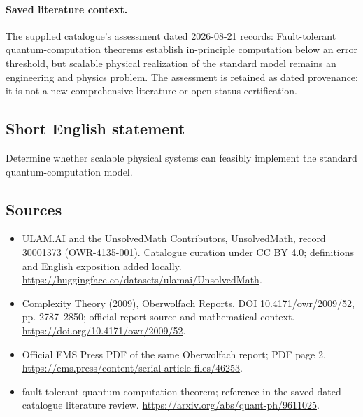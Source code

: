 \documentclass[11pt]{article}
\begin{document}
\paragraph{Saved literature context.} The supplied catalogue's assessment dated 2026-08-21 records: Fault-tolerant quantum-computation theorems establish in-principle computation below an error threshold, but scalable physical realization of the standard model remains an engineering and physics problem. The assessment is retained as dated provenance; it is not a new comprehensive literature or open-status certification.
\subsection{Short English statement}
Determine whether scalable physical systems can feasibly implement the standard quantum-computation model.
\subsection{Sources}
\begin{itemize}
\item[\hypertarget{source:30001373:1}{S1}] ULAM.AI and the UnsolvedMath Contributors, UnsolvedMath, record 30001373 (OWR-4135-001). Catalogue curation under CC BY 4.0; definitions and English exposition added locally.
\url{https://huggingface.co/datasets/ulamai/UnsolvedMath}.
\item[\hypertarget{source:30001373:2}{S2}] Complexity Theory (2009), Oberwolfach Reports, DOI 10.4171/owr/2009/52, pp. 2787--2850; official report source and mathematical context.
\url{https://doi.org/10.4171/owr/2009/52}.
\item[\hypertarget{source:30001373:3}{S3}] Official EMS Press PDF of the same Oberwolfach report; PDF page 2.
\url{https://ems.press/content/serial-article-files/46253}.
\item[\hypertarget{source:30001373:4}{S4}] fault-tolerant quantum computation theorem; reference in the saved dated catalogue literature review.
\url{https://arxiv.org/abs/quant-ph/9611025}.
\end{itemize}
\label{end:30001373}
\end{document}
